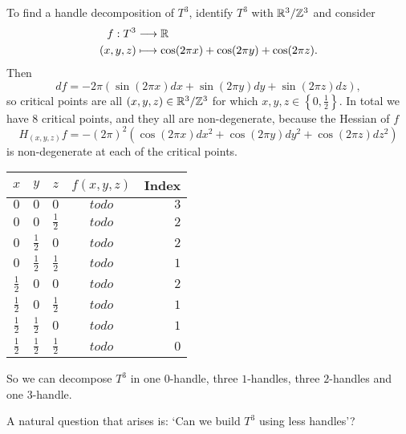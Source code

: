 \begin{eg}[$T^{3} = S^{1} \times S^{1} \times S^{2}$]
    To find a handle decomposition of $T^3$, identify $T^{3}$ with $\mathbb{R}^3 / \mathbb{Z}^{3}$ and consider
    \begin{align*}
        f: T^{3} &\longrightarrow \mathbb{R} \\
        (x, y, z) &\longmapsto \cos (2 \pi x) + \cos ( 2 \pi y) + \cos(2 \pi z)
    .\end{align*}
    Then
    \[
        df = -2\pi (\sin (2 \pi x) dx+ \sin ( 2 \pi y) dy + \sin(2 \pi z) dz)
    ,\] 
    so critical points are all $(x, y, z) \in \mathbb{R}^3 / \mathbb{Z}^3$ for which  $x, y, z \in \left\{0, \frac{1}{2}\right\}$.
    In total we have $8$ critical points, and they all are non-degenerate, because the Hessian of $f$
    \[
        H_{(x, y, z)} f = - (2 \pi)^2  (\cos (2 \pi x) dx^2 + \cos ( 2 \pi y) dy^2 + \cos(2 \pi z) dz^2)
    \] 
    is non-degenerate at each of the critical points.

    \begin{tabular}{ccccr}
        $x$ & $y$ & $z$ & $f(x, y, z)$ &  Index\\ \hline
        $0$ & $0$ & $0$ & $todo$ & $3$ \\
        $0$ & $0$ & $\frac{1}{2}$ & $todo$ & $2$ \\
        $0$ & $\frac{1}{2}$ & $0$ & $todo$ & $2$ \\
        $0$ & $\frac{1}{2}$ & $\frac{1}{2}$ & $todo$ & $1$ \\
        $\frac{1}{2}$ & $0$ & $0$ & $todo$ & $2$ \\
        $\frac{1}{2}$ & $0$ & $\frac{1}{2}$ & $todo$ & $1$ \\
        $\frac{1}{2}$ & $\frac{1}{2}$ & $0$ & $todo$ & $1$ \\
        $\frac{1}{2}$ & $\frac{1}{2}$ & $\frac{1}{2}$ & $todo$ & $0$ \\
    \end{tabular}

    So we can decompose $T^3$ in one $0$-handle, three $1$-handles, three $2$-handles and one $3$-handle.

    A natural question that arises is: `Can we build $T^{3}$ using less handles'?

\end{eg}




